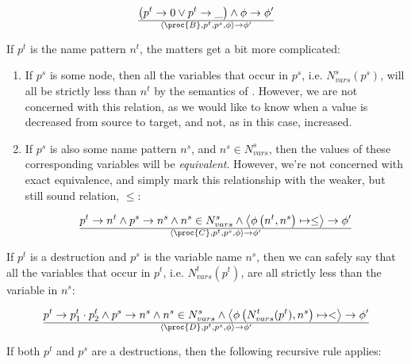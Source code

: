 \begin{equation}
{
\left(
    p^t\rightarrow 0
\vee
    p^t\rightarrow \_
\right)
  \wedge
    \phi\rightarrow\phi'
}\over{
  \left\langle\proc{B},p^t,p^s,\phi\right\rangle
  \rightarrow
  \phi'
}
\end{equation}

If $p^t$ is the name pattern $n^t$, the matters get a bit more complicated:

\begin{enumerate}

\item If $p^s$ is some node, then all the variables that occur in $p^s$, i.e.
$N_{vars}^s(p^s)$, will all be strictly less than $n^t$ by the semantics of
\D{}. However, we are not concerned with this relation, as we would like to
know when a value is decreased from source to target, and not, as in this case,
increased.

\item If $p^s$ is also some name pattern $n^s$, and  $n^s\in N^s_{vars}$, then
the values of these corresponding variables will be \emph{equivalent}. However,
we're not concerned with exact equivalence, and simply mark this relationship
with the weaker, but still sound relation, $\leq$:

\begin{equation}
{
    p^t\rightarrow n^t
  \wedge
    p^s\rightarrow n^s
  \wedge
    n^s\in N_{vars}^s
  \wedge
    \left\langle\phi\left(n^t, n^s\right)\mapsto \leq\right\rangle\rightarrow\phi'
}\over{
  \left\langle\proc{C},p^t,p^s,\phi\right\rangle
  \rightarrow
  \phi'
}
\end{equation}

\end{enumerate}

If $p^t$ is a destruction and $p^s$ is the variable name $n^s$, then we can safely say that
all the variables that occur in $p^t$, i.e. $N_{vars}^t(p^t)$, are all strictly less
than the variable in $n^s$:

\begin{equation}
{
    p^t\rightarrow p^t_1\cdot p^t_2
  \wedge
    p^s\rightarrow n^s
  \wedge
    n^s\in N_{vars}^s
  \wedge
    \left\langle\phi\left(N_{vars}^t(p^t), n^s\right)\mapsto <\right\rangle\rightarrow\phi'
}\over{
  \left\langle\proc{D},p^t,p^s,\phi\right\rangle
  \rightarrow
  \phi'
}
\end{equation}

If both $p^t$ and $p^s$ are a destructions, then the following recursive rule applies:

